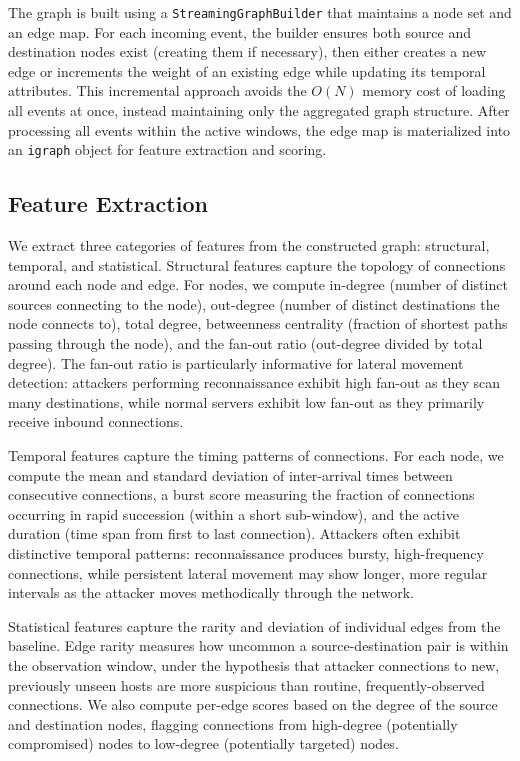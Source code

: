 \documentclass[letterpaper,twocolumn,10pt]{article}
\begin{document}
The graph is built using a \texttt{StreamingGraphBuilder} that maintains a node set and an edge map. For each incoming event, the builder ensures both source and destination nodes exist (creating them if necessary), then either creates a new edge or increments the weight of an existing edge while updating its temporal attributes. This incremental approach avoids the $O(N)$ memory cost of loading all events at once, instead maintaining only the aggregated graph structure. After processing all events within the active windows, the edge map is materialized into an \texttt{igraph} object for feature extraction and scoring.

\subsection{Feature Extraction}

We extract three categories of features from the constructed graph: structural, temporal, and statistical. Structural features capture the topology of connections around each node and edge. For nodes, we compute in-degree (number of distinct sources connecting to the node), out-degree (number of distinct destinations the node connects to), total degree, betweenness centrality (fraction of shortest paths passing through the node), and the fan-out ratio (out-degree divided by total degree). The fan-out ratio is particularly informative for lateral movement detection: attackers performing reconnaissance exhibit high fan-out as they scan many destinations, while normal servers exhibit low fan-out as they primarily receive inbound connections.

Temporal features capture the timing patterns of connections. For each node, we compute the mean and standard deviation of inter-arrival times between consecutive connections, a burst score measuring the fraction of connections occurring in rapid succession (within a short sub-window), and the active duration (time span from first to last connection). Attackers often exhibit distinctive temporal patterns: reconnaissance produces bursty, high-frequency connections, while persistent lateral movement may show longer, more regular intervals as the attacker moves methodically through the network.

Statistical features capture the rarity and deviation of individual edges from the baseline. Edge rarity measures how uncommon a source-destination pair is within the observation window, under the hypothesis that attacker connections to new, previously unseen hosts are more suspicious than routine, frequently-observed connections. We also compute per-edge scores based on the degree of the source and destination nodes, flagging connections from high-degree (potentially compromised) nodes to low-degree (potentially targeted) nodes.
\end{document}
